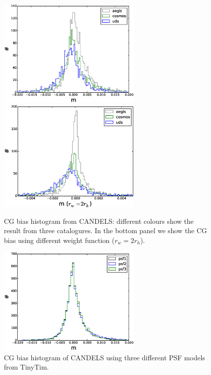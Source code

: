 \documentclass[useAMS,usenatbib]{mn2e}
\begin{document}
%
\begin{figure}
  \includegraphics[width=7.0cm]{zhiscgb.eps}
  \includegraphics[width=7.0cm]{zhiscgbno.eps}
\caption{CG bias histogram from CANDELS: different colours show the
  result from three catalogures. In the bottom panel we show the CG
  bias using different weight function ($r_w = 2r_h$).  }
\label{fig:cgbhis}
\end{figure}
%
\begin{figure}
  \includegraphics[width=7.0cm]{zcgbhis_psf.eps}
  \caption{CG bias histogram of CANDELS using three different PSF
    models from TinyTim.}
  \label{fig:candelspsf}
\end{figure}
%
\end{document}
